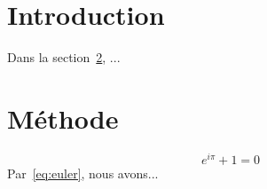 \documentclass{article}
\begin{document}
\section{Introduction}
\label{sec:intro}
Dans la section~\ref{sec:method}, ...

\section{Méthode}
\label{sec:method}

\begin{equation}
\label{eq:euler}
e^{i\pi} + 1 = 0
\end{equation}
Par~\eqref{eq:euler}, nous avons...
\end{document}
